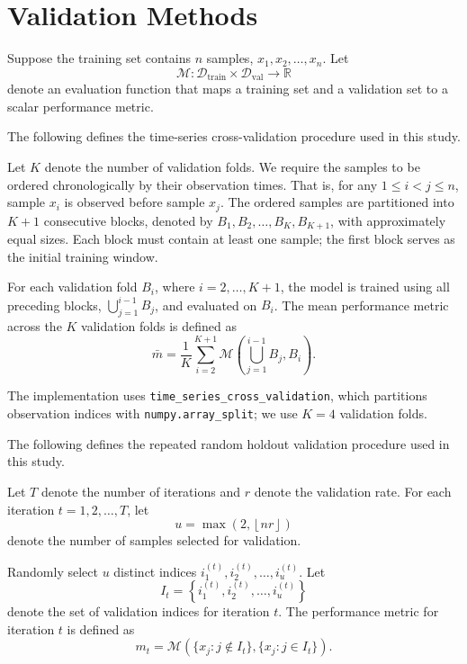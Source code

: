 \section[\appendixname~\thesection]{Validation Methods}
\label{sec:appendix_c}

Suppose the training set contains \(n\) samples, \(x_1, x_2, \dots, x_n\).
Let
\[
	\mathcal{M} : \mathcal{D}_{\mathrm{train}} \times \mathcal{D}_{\mathrm{val}} \to \mathbb{R}
\]
denote an evaluation function that maps a training set and a validation set to a scalar performance metric.

The following defines the time-series cross-validation procedure used in this study.

Let \(K\) denote the number of validation folds.
We require the samples to be ordered chronologically by their observation times.
That is, for any \(1 \le i < j \le n\), sample \(x_i\) is observed before sample \(x_j\).
The ordered samples are partitioned into \(K + 1\) consecutive blocks, denoted by \(B_1, B_2, \dots, B_K, B_{K + 1}\), with approximately equal sizes.
Each block must contain at least one sample; the first block serves as the initial training window.

For each validation fold \(B_i\), where \(i = 2, \dots, K+1\), the model is trained using all preceding blocks, \(\bigcup_{j=1}^{i-1} B_j\), and evaluated on \(B_i\).
The mean performance metric across the \(K\) validation folds is defined as
\[
	\bar{m} = \frac{1}{K} \sum_{i=2}^{K + 1} \mathcal{M} \left( \bigcup_{j=1}^{i-1} B_j, B_i \right).
\]

The implementation uses \texttt{time\_series\_cross\_validation}, which partitions observation indices with \texttt{numpy.array\_split}; we use \(K=4\) validation folds.

The following defines the repeated random holdout validation procedure used in this study.

Let \(T\) denote the number of iterations and \(r\) denote the validation rate.
For each iteration \(t = 1, 2, \dots, T\), let
\[
	u = \max \left(2, \left\lfloor nr \right\rfloor \right)
\]
denote the number of samples selected for validation.

Randomly select \(u\) distinct indices \(i_1^{(t)}, i_2^{(t)}, \dots, i_u^{(t)}\).
Let
\[
	I_t = \left\{ i_1^{(t)}, i_2^{(t)}, \dots, i_u^{(t)} \right\}
\]
denote the set of validation indices for iteration \(t\).
The performance metric for iteration \(t\) is defined as
\[
	m_t = \mathcal{M} \left( \{x_j : j \notin I_t\}, \{x_j : j \in I_t\} \right).
\]

